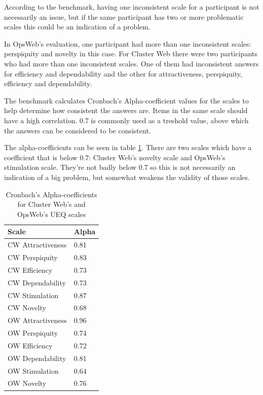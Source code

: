 According to the benchmark, having one inconsistent scale for a participant is not necessarily an issue, but if the same participant has two or more problematic scales this could be an indication of a problem. 

In OpsWeb's evaluation, one participant had more than one inconsistent scales: perspiquity and novelty in this case. For Cluster Web there were two participants who had more than one inconsistent scales. One of them had inconsistent answers for efficiency and dependability and the other for attractiveness, perspiquity, efficiency and dependability.

The benchmark calculates Cronbach's Alpha-coefficient \cite{cronbach1951coefficient} values for the scales to help determine how consistent the answers are. Items in the same scale should have a high correlation. 0.7 is commonly used as a treshold value, above which the answers can be considered to be consistent.

The alpha-coefficients can be seen in table \ref{alpha_coeff}. There are two scales which have a coefficient that is below 0.7: Cluster Web's novelty scale and OpsWeb's stimulation scale. They're not badly below 0.7 so this is not necessarily an indication of a big problem, but somewhat weakens the validity of those scales.

\begin{table}[!ht]
\def\arraystretch{1.1}%
    \begin{center}
    \caption{Cronbach's Alpha-coefficients for Cluster Web's and OpsWeb's UEQ scales}
    \label{alpha_coeff}
    \begin{tabular}{| l | l | }
    \hline
    Scale & Alpha  \\
    \hline
    CW Attractiveness    & 0.81       \\
    CW Perspiquity    & 0.83        \\
    CW Efficiency    & 0.73        \\
    CW Dependability    & 0.73        \\
    CW Stimulation    & 0.87        \\
    CW Novelty    & 0.68        \\
    \hline
    OW Attractiveness    & 0.96        \\
    OW Perspiquity    & 0.74        \\
    OW Efficiency    & 0.72        \\
    OW Dependability    & 0.81        \\
    OW Stimulation    & 0.64        \\
    OW Novelty    & 0.76        \\
    \hline
    \end{tabular}
    \end{center}
\end{table}

